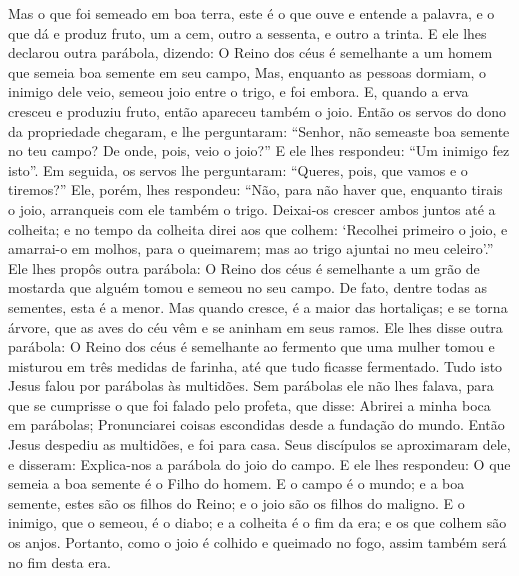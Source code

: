 {  Mas o que foi semeado em boa terra, este é o que ouve e entende a palavra, e o que dá e produz fruto, um a cem, outro a sessenta, e outro a trinta.
  E ele lhes declarou outra parábola, dizendo: O Reino dos céus é semelhante a um homem que semeia boa semente em seu campo,
  Mas, enquanto as pessoas dormiam, o inimigo dele veio, semeou joio entre o trigo, e foi embora.
  E, quando a erva cresceu e produziu fruto, então apareceu também o joio.
  Então os servos do dono da propriedade chegaram, e lhe perguntaram: “Senhor, não semeaste boa semente no teu campo? De onde, pois, veio o joio?”
  E ele lhes respondeu: “Um inimigo fez isto”. Em seguida, os servos lhe perguntaram: “Queres, pois, que vamos e o tiremos?”
  Ele, porém, lhes respondeu: “Não, para não haver que, enquanto tirais o joio, arranqueis com ele também o trigo.
  Deixai-os crescer ambos juntos até a colheita; e no tempo da colheita direi aos que colhem: ‘Recolhei primeiro o joio, e amarrai-o em molhos, para o queimarem; mas ao trigo ajuntai no meu celeiro’.”
  Ele lhes propôs outra parábola: O Reino dos céus é semelhante a um grão de mostarda que alguém tomou e semeou no seu campo.
  De fato, dentre todas as sementes, esta é a menor. Mas quando cresce, é a maior das hortaliças; e se torna
{} árvore, que as aves do céu vêm e se aninham em seus ramos.
  Ele lhes disse outra parábola: O Reino dos céus é semelhante ao fermento que uma mulher tomou e misturou em três medidas de farinha,
 até que tudo ficasse fermentado.
  Tudo isto Jesus falou por parábolas às multidões. Sem parábolas ele não lhes falava,
  para que se cumprisse o que foi falado pelo profeta, que disse: Abrirei a minha boca em parábolas; Pronunciarei coisas escondidas desde a fundação do mundo.
{}
  Então Jesus despediu as multidões, e foi para casa. Seus discípulos se aproximaram dele, e disseram: Explica-nos a parábola do joio do campo.
  E ele lhes respondeu: O que semeia a boa semente é o Filho do homem.
  E o campo é o mundo; e a boa semente, estes são os filhos do Reino; e o joio são os filhos do maligno.
  E o inimigo, que o semeou, é o diabo; e a colheita é o fim da era;
 e os que colhem são os anjos.
  Portanto, como o joio é colhido e queimado no fogo, assim também será no fim desta era.
}
